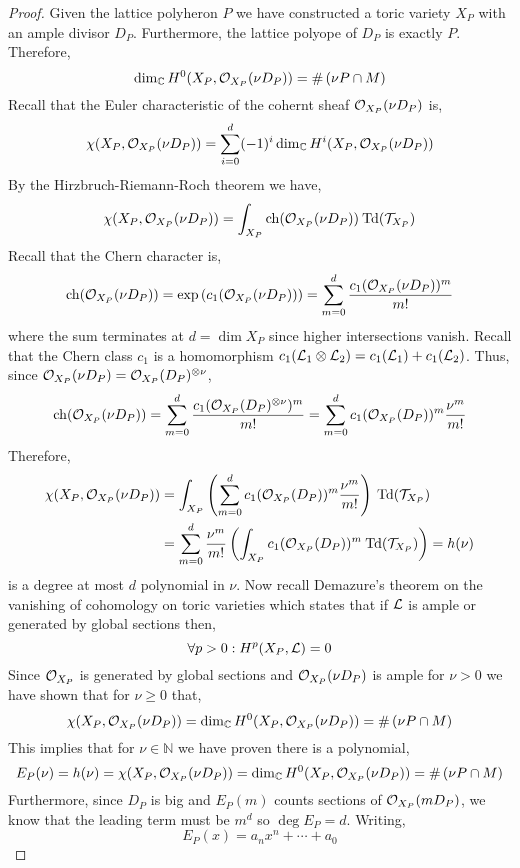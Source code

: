 \documentclass[12pt]{extarticle}
\newcommand{\C}{\mathbb{C}}
\newcommand{\N}{\mathbb{N}}
\theoremstyle{definition}
\begin{document}
\begin{proof}
Given the lattice polyheron $P$ we have constructed a toric variety $X_P$ with an ample divisor $D_P$. Furthermore, the lattice polyope of $D_P$ is exactly $P$. Therefore,
\[ \dim_{\C} H^0(X_P, \struct{X_P}(\nu D_P)) = \# \left( \nu P \cap M \right) \]
Recall that the Euler characteristic of the cohernt sheaf $\mathcal{O}_{X_P}(\nu D_P)$ is,
\[ \chi(X_P, \struct{X_P}(\nu D_P)) = \sum_{i = 0}^d (-1)^i \dim_{\C} H^i(X_P, \struct{X_P}(\nu D_P)) \]
By the Hirzbruch-Riemann-Roch theorem we have,
\[ \chi(X_P, \mathcal{O}_{X_P}(\nu D_P)) = \int_{X_P} \mathrm{ch}(\mathcal{O}_{X_P}(\nu D_P)) \: \mathrm{Td}(\mathcal{T}_{X_P}) \]
Recall that the Chern character is,
\[ \mathrm{ch}(\mathcal{O}_{X_P}(\nu D_P)) = \exp{(c_1(\mathcal{O}_{X_P}(\nu D_P)))} = \sum_{m = 0}^d \frac{c_1(\mathcal{O}_{X_P}(\nu D_P))^m}{m!} \] 
where the sum terminates at $d = \dim{X_P}$ since higher intersections vanish. Recall that the Chern class $c_1$ is a homomorphism $c_1(\mathcal{L}_1 \otimes \mathcal{L}_2) = c_1(\mathcal{L}_1) + c_1(\mathcal{L}_2)$. Thus, since $\mathcal{O}_{X_P}(\nu D_P) = \mathcal{O}_{X_P}(D_P)^{\otimes \nu}$,
\[ \mathrm{ch}(\mathcal{O}_{X_P}(\nu D_P)) = \sum_{m = 0}^d \frac{c_1(\mathcal{O}_{X_P}(D_P)^{\otimes \nu})^m}{m!} =  \sum_{m = 0}^d c_1(\mathcal{O}_{X_P}(D_P))^m \frac{\nu^m}{m!} \] 
Therefore,
\begin{align*}
\chi(X_P, \mathcal{O}_{X_P}(\nu D_P)) & = \int_{X_P} \left( \sum_{m = 0}^d c_1(\mathcal{O}_{X_P}(D_P))^m \frac{\nu^m}{m!} \right) \: \mathrm{Td}(\mathcal{T}_{X_P}) 
\\
& = \sum_{m = 0}^d \frac{\nu^m}{m!} \left( \int_{X_P} c_1(\mathcal{O}_{X_P}(D_P))^m \: \mathrm{Td}(\mathcal{T}_{X_P}) \right) = h(\nu) 
\end{align*}
is a degree at most $d$ polynomial in $\nu$. Now recall Demazure's theorem on the vanishing of cohomology on toric varieties which states that if $\mathcal{L}$ is ample or generated by global sections then,
\[ \forall p > 0 : H^p(X_P, \mathcal{L}) = 0 \]
Since $\mathcal{O}_{X_P}$ is generated by global sections and $\mathcal{O}_{X_P}(\nu D_P)$ is ample for $\nu > 0$ we have shown that for $\nu \ge 0$ that,
\[ \chi(X_P, \struct{X_P}(\nu D_P)) = \dim_{\C} H^0(X_P, \struct{X_P}(\nu D_P)) = \# \left( \nu P \cap M \right) \]
This implies that for $\nu \in \N$ we have proven there is a polynomial,
\[ E_P(\nu) = h(\nu) = \chi(X_P, \struct{X_P}(\nu D_P)) = \dim_{\C} H^0(X_P, \struct{X_P}(\nu D_P)) = \# \left( \nu P \cap M \right) \]
Furthermore, since $D_P$ is big and $E_P(m)$ counts sections of $\mathcal{O}_{X_P}(m D_P)$, we know that the leading term must be $m^d$ so $\deg{E_P} = d$. Writing,
\[ E_P(x) = a_n x^n + \cdots + a_0 \]

\end{proof}
\end{document}
